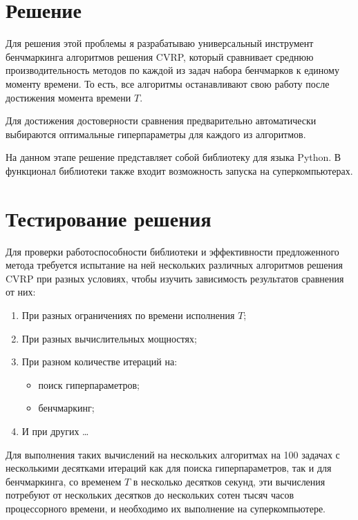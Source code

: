 \documentclass[a4paper,12pt]{article}
\begin{document}
\section*{Решение}
Для решения этой проблемы я разрабатываю универсальный инструмент бенчмаркинга алгоритмов решения CVRP, который сравнивает среднюю производительность методов по каждой из задач набора бенчмарков к единому моменту времени.
То есть, все алгоритмы останавливают свою работу после достижения момента времени $T$.

Для достижения достоверности сравнения предварительно автоматически выбираются оптимальные гиперпараметры для каждого из алгоритмов.

На данном этапе решение представляет собой библиотеку для языка Python.
В функционал библиотеки также входит возможность запуска на суперкомпьютерах.

\section*{Тестирование решения}
Для проверки работоспособности библиотеки и эффективности предложенного метода требуется испытание на ней нескольких различных алгоритмов решения CVRP при разных условиях, чтобы изучить зависимость результатов сравнения от них:

\begin{enumerate}
    \item При разных ограничениях по времени исполнения $T$;
    \item При разных вычислительных мощностях;
    \item При разном количестве итераций на:
    \begin{itemize}
        \item поиск гиперпараметров;
        \item бенчмаркинг;
    \end{itemize}
    \item[] И при других \dots
\end{enumerate}

Для выполнения таких вычислений на нескольких алгоритмах на 100 задачах с несколькими десятками итераций как для поиска гиперпараметров, так и для бенчмаркинга, со временем $T$ в несколько десятков секунд, эти вычисления потребуют от  нескольких десятков до нескольких сотен тысяч часов  процессорного времени, и необходимо их выполнение на  суперкомпьютере.

\printbibliography
\end{document}
